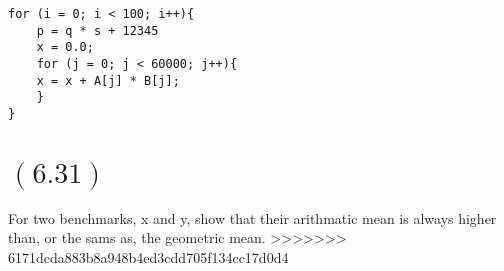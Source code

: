 \documentclass[letterpaper,12pt,titlepage]{article}
\begin{document}
\begin{verbatim}
for (i = 0; i < 100; i++){
    p = q * s + 12345
    x = 0.0;
    for (j = 0; j < 60000; j++){
    x = x + A[j] * B[j];
    }
}
\end{verbatim}

\begin{mdframed}[style=MyFrame]
\end{mdframed}

\section*{$(6.31)$} For two benchmarks, x and y, show that their arithmatic mean is always higher than, or the sams as, the geometric mean.
>>>>>>> 6171dcda883b8a948b4ed3cdd705f134cc17d0d4

\begin{mdframed}[style=MyFrame]
\end{mdframed}



\end{document}
